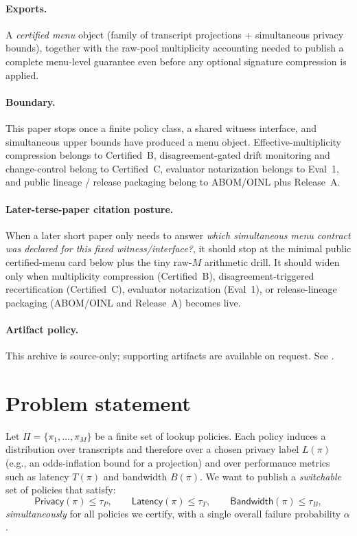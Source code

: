 \documentclass[11pt]{article}
\begin{document}
\paragraph{Exports.}
A \emph{certified menu} object (family of transcript projections + simultaneous privacy bounds), together with the raw-pool multiplicity accounting needed to publish a complete menu-level guarantee even before any optional signature compression is applied.

\paragraph{Boundary.}
This paper stops once a finite policy class, a shared witness interface, and simultaneous upper bounds have produced a menu object.
Effective-multiplicity compression belongs to Certified~B, disagreement-gated drift monitoring and change-control belong to Certified~C, evaluator notarization belongs to Eval~1, and public lineage / release packaging belong to ABOM/OINL plus Release~A.\cite{series:sigcomp,series:recert,series:eval1,series:releaseA}

\paragraph{Later-terse-paper citation posture.}
When a later short paper only needs to answer \emph{which simultaneous menu contract was declared for this fixed witness/interface?}, it should stop at the minimal public certified-menu card below plus the tiny raw-$M$ arithmetic drill.
It should widen only when multiplicity compression (Certified~B), disagreement-triggered recertification (Certified~C), evaluator notarization (Eval~1), or release-lineage packaging (ABOM/OINL and Release~A) becomes live.\cite{series:sigcomp,series:recert,series:eval1,series:abomoinl,series:releaseA}

\paragraph{Artifact policy.}
This archive is source-only; supporting artifacts are available on request. See \cite{series:artifactpolicy}.

\section{Problem statement}
Let $\Pi=\{\pi_1,\dots,\pi_M\}$ be a finite set of lookup policies.
Each policy induces a distribution over transcripts and therefore over a chosen privacy label $L(\pi)$ (e.g., an odds-inflation bound for a projection) and over performance metrics such as latency $T(\pi)$ and bandwidth $B(\pi)$.
We want to publish a \emph{switchable} set of policies that satisfy:
\[
\textsf{Privacy}(\pi)\le \tau_P,\qquad \textsf{Latency}(\pi)\le \tau_T,\qquad \textsf{Bandwidth}(\pi)\le \tau_B,
\]
\emph{simultaneously} for all policies we certify, with a single overall failure probability $\alpha$.
\end{document}
